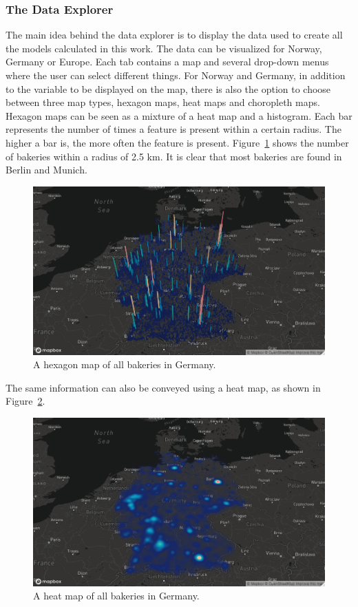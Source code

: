 \subsubsection*{The Data Explorer}
The main idea behind the data explorer is to display the data used to create all the models calculated in this work. The data can be visualized for Norway, Germany or Europe. Each tab contains a map and several drop-down menus where the user can select different things. For Norway and Germany, in addition to the variable to be displayed on the map, there is also the option to choose between three map types, hexagon maps, heat maps and choropleth maps. Hexagon maps can be seen as a mixture of a heat map and a histogram. Each bar represents the number of times a feature is present within a certain radius. The higher a bar is, the more often the feature is present. Figure~\ref{fig:map_1} shows the number of bakeries within a radius of 2.5 km. It is clear that most bakeries are found in Berlin and Munich.
\begin{figure}[H]
    \centering
    \includegraphics[width = \textwidth]{bakeries_germany_hex.png}
    \caption{A hexagon map of all bakeries in Germany.}
    \label{fig:map_1}
\end{figure}
The same information can also be conveyed using a heat map, as shown in Figure~\ref{fig:map_2}.
\begin{figure}[H]
    \centering
    \includegraphics[width = \textwidth]{bakeries_germany_heat.png}
    \caption{A heat map of all bakeries in Germany.}
    \label{fig:map_2}
\end{figure}
